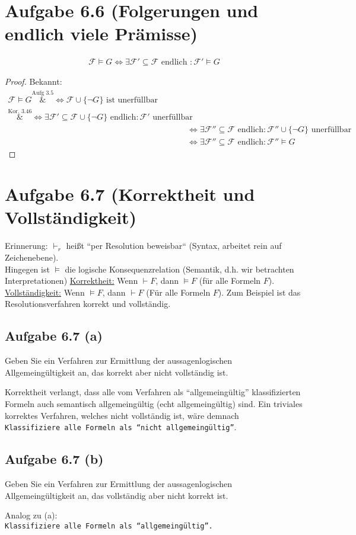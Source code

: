 \documentclass[12pt,a4paper]{article}
\newcommand{\F}{\mathcal{F}}
\begin{document}
\section*{Aufgabe 6.6 (Folgerungen und endlich viele Prämisse)}
\begin{align*}
\F\models G\Longleftrightarrow \exists\F'\subseteq\F\text{ endlich }:\F'\models G
\end{align*}
\begin{proof}
Bekannt:
\begin{align*}
\F\models G
\overset{\text{Aufg 3.5}}&\Longleftrightarrow
\F\cup\lbrace\neg G\rbrace\text{ ist unerfüllbar}\\
\overset{\text{Kor. 3.46}}&\Longleftrightarrow
\exists\F'\subseteq\F\cup\lbrace\neg G\rbrace\text{ endlich}:\F'\text{ unerfüllbar}\\
&\Longleftrightarrow
\exists\F''\subseteq\F\text{ endlich}:\F''\cup\lbrace\neg G\rbrace\text{ unerfüllbar}\\
&\Longleftrightarrow
\exists\F''\subseteq\F\text{ endlich}:\F''\models G
\end{align*}
\end{proof}

\section*{Aufgabe 6.7 (Korrektheit und Vollständigkeit)}
Erinnerung: $\vdash_r$ heißt ``per Resolution beweisbar`` (Syntax, arbeitet rein auf Zeichenebene).\\
 Hingegen ist $\models$ die logische Konsequenzrelation (Semantik, d.h. wir betrachten Interpretationen)\nl
\ul{Korrektheit:} Wenn $\vdash F$, dann $\models F$ (für alle Formeln $F$).
\nl
\ul{Vollständigkeit:} Wenn $\models F$, dann $\vdash F$ (Für alle Formeln $F$).\nl
Zum Beispiel ist das Resolutionsverfahren korrekt und vollständig.

\subsection*{Aufgabe 6.7 (a)}
Geben Sie ein Verfahren zur Ermittlung der aussagenlogischen Allgemeingültigkeit
an, das korrekt aber nicht vollständig ist.

\begin{lösung}
Korrektheit verlangt, dass alle vom Verfahren als ``allgemeingültig'' klassifizierten Formeln auch semantisch allgemeingültig (echt allgemeingültig) sind.\nl
Ein triviales korrektes Verfahren, welches nicht vollständig ist, wäre demnach\\
\texttt{Klassifiziere alle Formeln als ``nicht allgemeingültig''}.
\end{lösung}

\subsection*{Aufgabe 6.7 (b)}
Geben Sie ein Verfahren zur Ermittlung der aussagenlogischen Allgemeingültigkeit
an, das vollständig aber nicht korrekt ist.

\begin{lösung}
Analog zu (a):\\
\texttt{Klassifiziere alle Formeln als ``allgemeingültig''.}
\end{lösung}
\end{document}
